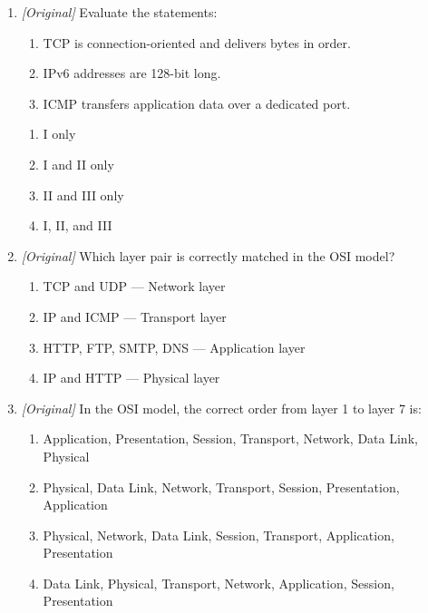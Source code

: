 \begin{enumerate}[label=\textbf{Q\arabic*.}, leftmargin=*]
\begin{enumerate}[label=\Alph*.]
    \item POP3 --- downloads received mail to the local machine
    \item IMAP --- sends outgoing mail to the server
    \item SMTP --- translates names into IP addresses
  \end{enumerate}
\item \textit{[Original]} Evaluate the statements:
  \begin{enumerate}[label=\Roman*.]
    \item TCP is connection-oriented and delivers bytes in order.
    \item IPv6 addresses are 128-bit long.
    \item ICMP transfers application data over a dedicated port.
  \end{enumerate}
  \begin{enumerate}[label=\Alph*.]
    \item I only
    \item I and II only
    \item II and III only
    \item I, II, and III
  \end{enumerate}
\item \textit{[Original]} Which layer pair is correctly matched in the OSI
  model?
  \begin{enumerate}[label=\Alph*.]
    \item TCP and UDP --- Network layer
    \item IP and ICMP --- Transport layer
    \item HTTP, FTP, SMTP, DNS --- Application layer
    \item IP and HTTP --- Physical layer
  \end{enumerate}
\item \textit{[Original]} In the OSI model, the correct order from layer 1 to
  layer 7 is:
  \begin{enumerate}[label=\Alph*.]
    \item Application, Presentation, Session, Transport, Network, Data Link,
      Physical
    \item Physical, Data Link, Network, Transport, Session, Presentation,
      Application
    \item Physical, Network, Data Link, Session, Transport, Application,
      Presentation
    \item Data Link, Physical, Transport, Network, Application, Session,
      Presentation
  \end{enumerate}

\end{enumerate}
